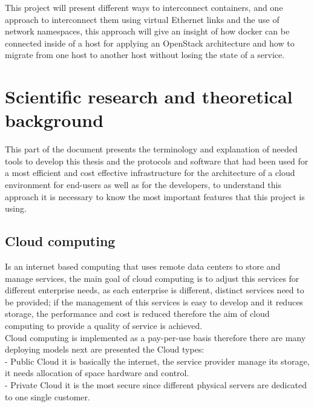 This project will present different ways to interconnect containers, and one approach to interconnect them using virtual Ethernet links and the use of network namespaces, this approach will give an insight of how docker can be connected inside of a host for applying an OpenStack architecture and how to migrate from one host to another host without losing the state of a service.\\
 
  
\chapter{Scientific research and theoretical background} %

\label{Scientific research and theoretical background}
 
 
This part of the document presents the terminology and explanation of needed tools to develop this thesis and the protocols and software that had been used for a most efficient and cost effective infrastructure for the architecture of a cloud environment for end-users as well as for the developers, to understand this approach it is necessary to know the most important features that this project is using.\\
 
\section{Cloud computing}
 
Is an internet based computing that uses remote data centers to store and manage services, the main goal of cloud computing is to adjust this services for different enterprise needs, as each enterprise is different, distinct services need to be provided; if the management of this services is easy to develop and it reduces storage, the performance and cost is reduced therefore the aim of cloud computing to provide a quality of service is achieved.\\
 
Cloud computing is implemented as a pay-per-use basis therefore there are many deploying models next are presented the Cloud types:\\
 
- Public Cloud it is basically the internet, the service provider manage its storage, it needs allocation of space hardware and control.\\

- Private Cloud it is the most secure since different physical servers are dedicated to one single customer.\\

